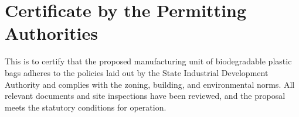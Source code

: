\section*{Certificate by the Permitting Authorities}
This is to certify that the proposed manufacturing unit of biodegradable plastic bags adheres to the policies laid out by the State Industrial Development Authority and complies with the zoning, building, and environmental norms. All relevant documents and site inspections have been reviewed, and the proposal meets the statutory conditions for operation.

